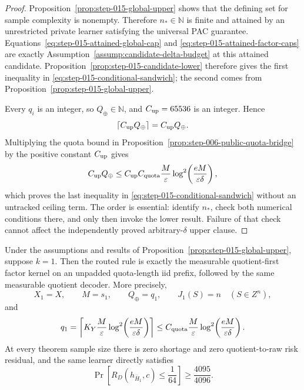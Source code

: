 \begin{proof}
Proposition~\ref{prop:step-015-global-upper} shows that the defining
set for sample complexity is nonempty.  Therefore \(n_*\in\mathbb N\)
is finite and attained by an unrestricted private learner satisfying
the universal PAC guarantee.
Equations~\eqref{eq:step-015-attained-global-cap} and
\eqref{eq:step-015-attained-factor-caps} are exactly
Assumption~\ref{assump:candidate-delta-budget} at this attained
candidate.  Proposition~\ref{prop:step-015-candidate-lower} therefore
gives the first inequality in
\eqref{eq:step-015-conditional-sandwich}; the second comes from
Proposition~\ref{prop:step-015-global-upper}.

Every \(q_i\) is an integer, so \(Q_\oplus\in\mathbb N\), and
\(C_{\rm up}=65536\) is an integer.  Hence
\begin{equation}\label{eq:step-015-exact-ceiling-removal}
\left\lceil C_{\rm up}Q_\oplus\right\rceil
=C_{\rm up}Q_\oplus.
\end{equation}
Multiplying the quota bound in
Proposition~\ref{prop:step-006-public-quota-bridge} by the positive
constant \(C_{\rm up}\) gives
\begin{equation}\label{eq:step-015-final-rate-bridge}
C_{\rm up}Q_\oplus
\le C_{\rm up}C_{\rm quota}
\frac{M}{\varepsilon}
\log^2\!\left(\frac{eM}{\varepsilon\delta}\right),
\end{equation}
which proves the last inequality in
\eqref{eq:step-015-conditional-sandwich} without an untracked ceiling
term.  The order is essential: identify \(n_*\), check both numerical
conditions there, and only then invoke the lower result.  Failure of
that check cannot affect the independently proved arbitrary-\(\delta\)
upper clause.
\end{proof}

\begin{proposition}
\label{prop:step-015-one-factor-upper}
Under the assumptions and results of
Proposition~\ref{prop:step-015-global-upper}, suppose \(k=1\).  Then the
routed rule is exactly the measurable quotient-first factor kernel on
an unpadded quota-length iid prefix, followed by the same measurable
quotient decoder.  More precisely,
\begin{equation}\label{eq:step-015-one-factor-upper-identities}
X_1=X,
\qquad
M=s_1,
\qquad
Q_\oplus=q_1,
\qquad
J_1(S)=n\quad(S\in Z^n),
\end{equation}
and
\begin{equation}\label{eq:step-015-one-factor-quota}
q_1=\left\lceil
K_Y\frac{M}{\varepsilon}
\log^2\!\left(\frac{eM}{\varepsilon\delta}\right)
\right\rceil
\le C_{\rm quota}\frac{M}{\varepsilon}
\log^2\!\left(\frac{eM}{\varepsilon\delta}\right).
\end{equation}
At every theorem sample size there is zero shortage and zero
quotient-to-raw risk residual, and the same learner directly satisfies
\begin{equation}\label{eq:step-015-one-factor-strong-utility}
\Pr\left[R_D(h_{\bar H_1},c)\le\frac1{64}\right]
\ge\frac{4095}{4096}.
\end{equation}
\end{proposition}

